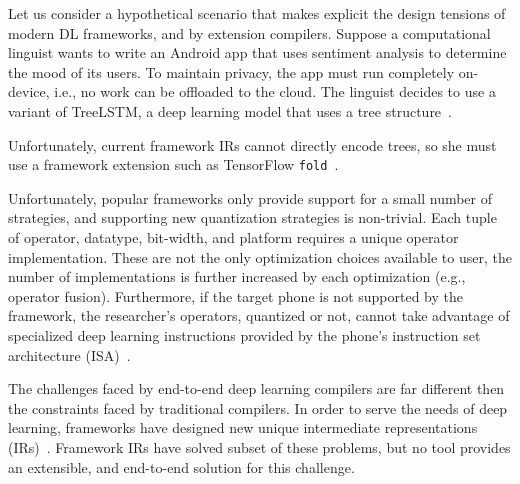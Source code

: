 Let us consider a hypothetical scenario that makes explicit
  the design tensions of modern DL frameworks, and by
  extension compilers.
Suppose a computational linguist wants to write
  an Android app that uses sentiment analysis to
  determine the mood of its users.
To maintain privacy, the app must run completely on-device,
  i.e., no work can be offloaded to the cloud.
The linguist decides to use a variant of TreeLSTM,
  a deep learning model that uses a tree structure~\citep{tree_lstm}.

Unfortunately, current framework IRs cannot directly encode trees,
  so she must use a framework extension
  such as TensorFlow \verb|fold|~\citep{tensorflowfold}.

Unfortunately, popular frameworks only provide support for a small number
  of strategies, and supporting new quantization strategies is non-trivial.
Each tuple of operator, datatype, bit-width, and
  platform requires a unique operator implementation.
These are not the only optimization choices available
  to user, the number of implementations is further
  increased by each optimization (e.g., operator fusion).
Furthermore, if the target phone
  is not supported by the framework,
  the researcher's operators,
  quantized or not,
  cannot take advantage of specialized deep learning instructions
  provided by the phone's instruction set architecture (ISA)~\citep{apple_neural_engine}.

The challenges faced by end-to-end deep learning compilers are far
  different then the constraints faced by traditional compilers.
In order to serve the needs of deep learning, frameworks have designed new
  unique intermediate representations (IRs)~\citep{tensorflow, pytorch_ad, chainer_learningsys2015, tangent, theano, glow}.
Framework IRs have solved subset of these problems,
  but no tool provides an extensible,
  and end-to-end solution for this challenge.


